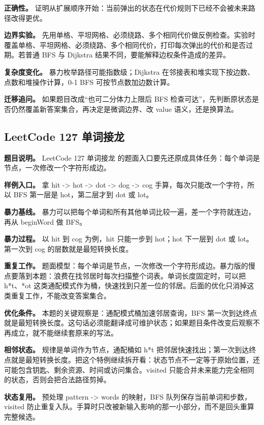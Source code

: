 \textbf{正确性。} 证明从扩展顺序开始：当前弹出的状态在代价规则下已经不会被未来路径改得更优。

\textbf{边界实验。} 先用单格、平坦网格、必须绕路、多个相同代价做反例检查。实验时覆盖单格、平坦网格、必须绕路、多个相同代价，打印每次弹出的代价和是否过期。若普通 BFS 与 Dijkstra 结果不同，要能解释边权条件造成的差异。

\textbf{复杂度变化。} 暴力枚举路径可能指数级；Dijkstra 在邻接表和堆实现下按边数、点数和堆操作计算，0-1 BFS 可按节点数加边数计算。

\textbf{迁移追问。} 如果题目改成“也可二分体力上限后 BFS 检查可达”，先判断原状态是否仍然覆盖新答案集合，再决定是微调边界、改 value 语义，还是换算法。

\subsection{LeetCode 127 单词接龙}

\textbf{题目说明。} LeetCode 127 单词接龙 的题面入口要先还原成具体任务：每个单词是节点，一次修改一个字符形成边。

\textbf{样例入口。} 拿 hit -> hot -> dot -> dog -> cog 手算，每次只能改一个字符，所以 BFS 第一层是 hot，第二层才到 dot 或 lot。

\textbf{暴力基线。} 暴力可以把每个单词和所有其他单词比较一遍，差一个字符就连边，再从 beginWord 做 BFS。

\textbf{暴力过程。} 以 hit 到 cog 为例，hit 只能一步到 hot；hot 下一层到 dot 或 lot。第一次到 cog 的层数就是最短转换长度。

\textbf{重复工作。} 题面模型：每个单词是节点，一次修改一个字符形成边。暴力版的慢点要落到本题：浪费在找邻居时每次扫描整个词表。单词长度固定时，可以把 h*t、*ot 这类通配模式作为桶，快速找到只差一位的邻居。后面的优化只消掉这类重复工作，不能改变答案集合。

\textbf{优化条件。} 本题的关键观察是：通配模式桶加速邻居查询，BFS 第一次到达终点就是最短转换长度。这句话必须能翻译成可维护状态；如果题目条件改变后观察不再成立，就不能继续套原来的写法。

\textbf{相邻状态。} 规律是单词作为节点，通配桶如 h*t 把邻居快速找出；第一次到达终点就是最短转换长度。把这个特例继续拆开看：状态节点不一定等于原始位置，还可能包含钥匙、剩余资源、时间或访问集合。visited 只能合并未来能力完全相同的状态，否则会把合法路径剪掉。

\textbf{状态复用。} 预处理 pattern -> words 的映射，BFS 队列保存当前单词和步数，visited 防止重复入队。手算时只改被新输入影响的那一小部分，而不是回头重算完整候选。

